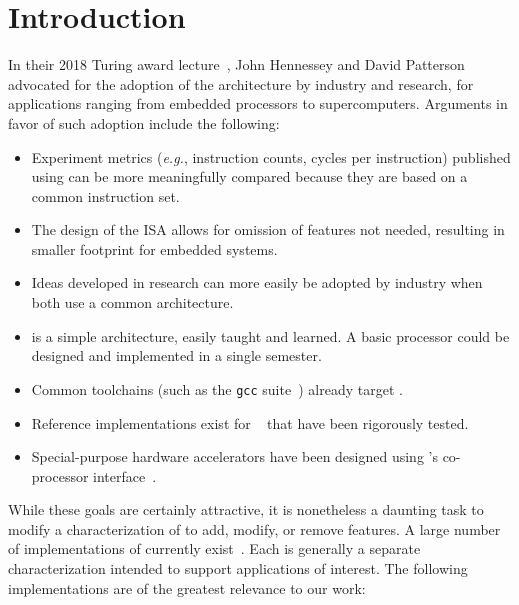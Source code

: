 \documentclass[conference]{IEEEtran}
\begin{document}
\section{Introduction}

In their 2018 Turing award lecture~\cite{HPTuring}, John Hennessey and David Patterson advocated for the adoption of the \Riscv{} architecture by industry and research, for applications ranging from embedded processors to supercomputers.  Arguments in favor of such adoption include the following:
\begin{itemize}
    \item Experiment metrics (\textit{e.g.}, instruction counts,  cycles per instruction) published using \Riscv{} can be more meaningfully compared because they are based on a common instruction set.
    \item The design of the \Riscv{} ISA allows for omission of features not needed, resulting in smaller footprint for embedded systems.
    \item Ideas developed in research can more easily be adopted by industry when both use a common architecture.
    \item \Riscv{} is a simple architecture, easily taught and learned.  A basic processor could be designed and implemented in a single semester.
    \item Common toolchains (such as the \texttt{gcc} suite~\cite{GCC:22}) already target \Riscv{}.
    \item Reference implementations exist for \Riscv{}~\cite{chisel:riscv,RvMini,boom, WD:22} that have been rigorously tested.
    \item Special-purpose hardware accelerators have been designed using \Riscv's co-processor interface~\cite{chisel:riscv}.
\end{itemize}
While these goals are certainly attractive, it is nonetheless a daunting task to modify a characterization of \Riscv{} to add, modify, or remove features.  A large number of implementations of \Riscv{} currently exist~\cite{riscvimplementations}.  Each is generally a separate characterization intended to support applications of interest.  The following implementations are of the greatest relevance to our work:
\end{document}
